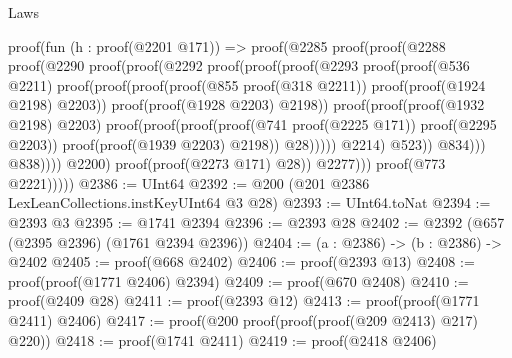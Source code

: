 \begin{lexlean}{Laws}
\begin{coremodule}
                            proof(fun (h : proof(@2201 @171)) =>
                              proof(@2285
                                  proof(proof(@2288
                                        proof(@2290
                                            proof(proof(@2292
                                                  proof(proof(proof(@2293
                                                          proof(proof(@536 @2211)
                                                              proof(proof(proof(proof(@855
                                                                        proof(@318 @2211))
                                                                      proof(proof(@1924 @2198)
                                                                          @2203))
                                                                    proof(proof(@1928 @2203) @2198))
                                                                  proof(proof(proof(@1932 @2198)
                                                                        @2203)
                                                                      proof(proof(proof(proof(@741
                                                                                proof(@2225 @171))
                                                                              proof(@2295 @2203))
                                                                            proof(proof(@1939 @2203)
                                                                                @2198))
                                                                          @28)))))
                                                        @2214)
                                                      @523))
                                                @834)))
                                      @838))))
                          @2200)
                        proof(proof(@2273 @171) @28))
                      @2277)))
              proof(@773 @2221)))))
@2386 := UInt64
@2392 := @200 (@201 @2386 LexLeanCollections.instKeyUInt64 @3 @28)
@2393 := UInt64.toNat
@2394 := @2393 @3
@2395 := @1741 @2394
@2396 := @2393 @28
@2402 := @2392 (@657 (@2395 @2396) (@1761 @2394 @2396))
@2404 := (a : @2386) -> (b : @2386) -> @2402
@2405 := proof(@668 @2402)
@2406 := proof(@2393 @13)
@2408 := proof(proof(@1771 @2406) @2394)
@2409 := proof(@670 @2408)
@2410 := proof(@2409 @28)
@2411 := proof(@2393 @12)
@2413 := proof(proof(@1771 @2411) @2406)
@2417 := proof(@200 proof(proof(proof(@209 @2413) @217) @220))
@2418 := proof(@1741 @2411)
@2419 := proof(@2418 @2406)

\end{coremodule}
\end{lexlean}
